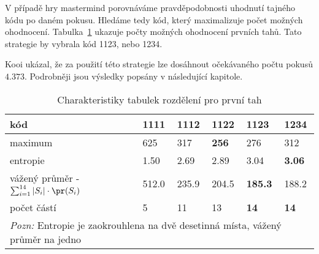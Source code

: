 V případě hry mastermind porovnáváme pravděpodobnosti uhodnutí tajného kódu po daném pokusu. Hledáme tedy kód, který maximalizuje počet možných ohodnocení. Tabulka~\ref{tab02} ukazuje počty možných ohodnocení prvních tahů. Tato strategie by vybrala kód 1123, nebo 1234. 

Kooi ukázal, že za použití této strategie lze dosáhnout očekávaného počtu pokusů $4.373$. Podrobněji jsou výsledky popsány v následující kapitole.







\begin{table}[h]
\centering
\begin{tabular}{l l l l l l}
\toprule
kód & 1111 & 1112 & 1122 & 1123 & 1234 \\
\midrule

maximum & 625 & 317 & \textbf{256} & 276 & 312 \\
entropie & 1.50 & 2.69 & 2.89 & 3.04 & \textbf{3.06}\\


vážený průměr - $\sum_{i = 1}^{14} |S_i|  \cdot \pr (S_i)$
& 512.0 & 235.9 & 204.5 & \textbf{185.3} & 188.2 \\


počet částí & 5 & 11 & 13 & \textbf{14} & \textbf{14} \\

\bottomrule
\multicolumn{6}{l}{\footnotesize \textit{Pozn:}
Entropie je zaokrouhlena na dvě desetinná místa, vážený průměr na jedno}
\end{tabular}
\caption{Charakteristiky tabulek rozdělení pro první tah}\label{tab02}
\end{table}

